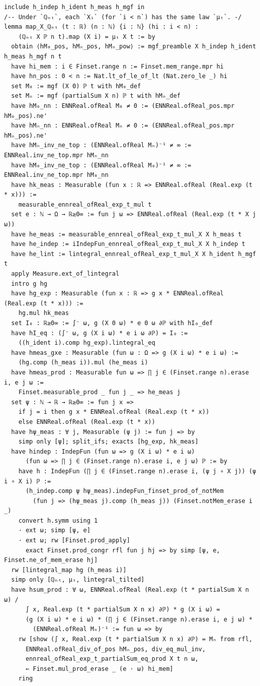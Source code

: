 \newpage
\begin{lstlisting}
include h_indep h_ident h_meas h_mgf in
/-- Under `ℚₙₜ`, each `Xᵢ` (for `i < n`) has the same law `μₜ`. -/
lemma map_X_ℚₙₜ (t : ℝ) (n : ℕ) {i : ℕ} (hi : i < n) :
    (ℚₙₜ X ℙ n t).map (X i) = μₜ X t := by
  obtain ⟨hM₀_pos, hMₙ_pos, hMₙ_pow⟩ := mgf_preamble X h_indep h_ident h_meas h_mgf n t
  have hi_mem : i ∈ Finset.range n := Finset.mem_range.mpr hi
  have hn_pos : 0 < n := Nat.lt_of_le_of_lt (Nat.zero_le _) hi
  set M₀ := mgf (X 0) ℙ t with hM₀_def
  set Mₙ := mgf (partialSum X n) ℙ t with hMₙ_def
  have hM₀_nn : ENNReal.ofReal M₀ ≠ 0 := (ENNReal.ofReal_pos.mpr hM₀_pos).ne'
  have hMₙ_nn : ENNReal.ofReal Mₙ ≠ 0 := (ENNReal.ofReal_pos.mpr hMₙ_pos).ne'
  have hMₙ_inv_ne_top : (ENNReal.ofReal Mₙ)⁻¹ ≠ ∞ := ENNReal.inv_ne_top.mpr hMₙ_nn
  have hM₀_inv_ne_top : (ENNReal.ofReal M₀)⁻¹ ≠ ∞ := ENNReal.inv_ne_top.mpr hM₀_nn
  have hk_meas : Measurable (fun x : ℝ => ENNReal.ofReal (Real.exp (t * x))) :=
    measurable_ennreal_ofReal_exp_t_mul t
  set e : ℕ → Ω → ℝ≥0∞ := fun j ω => ENNReal.ofReal (Real.exp (t * X j ω))
  have he_meas := measurable_ennreal_ofReal_exp_t_mul_X X h_meas t
  have he_indep := iIndepFun_ennreal_ofReal_exp_t_mul_X X h_indep t
  have he_lint := lintegral_ennreal_ofReal_exp_t_mul_X X h_ident h_mgf t
  apply Measure.ext_of_lintegral
  intro g hg
  have hg_exp : Measurable (fun x : ℝ => g x * ENNReal.ofReal (Real.exp (t * x))) :=
    hg.mul hk_meas
  set I₀ : ℝ≥0∞ := ∫⁻ ω, g (X 0 ω) * e 0 ω ∂ℙ with hI₀_def
  have hI_eq : (∫⁻ ω, g (X i ω) * e i ω ∂ℙ) = I₀ :=
    ((h_ident i).comp hg_exp).lintegral_eq
  have hmeas_gxe : Measurable (fun ω : Ω => g (X i ω) * e i ω) :=
    (hg.comp (h_meas i)).mul (he_meas i)
  have hmeas_prod : Measurable fun ω => ∏ j ∈ (Finset.range n).erase i, e j ω :=
    Finset.measurable_prod _ fun j _ => he_meas j
  set ψ : ℕ → ℝ → ℝ≥0∞ := fun j x =>
    if j = i then g x * ENNReal.ofReal (Real.exp (t * x))
    else ENNReal.ofReal (Real.exp (t * x))
  have hψ_meas : ∀ j, Measurable (ψ j) := fun j => by
    simp only [ψ]; split_ifs; exacts [hg_exp, hk_meas]
  have hindep : IndepFun (fun ω => g (X i ω) * e i ω)
      (fun ω => ∏ j ∈ (Finset.range n).erase i, e j ω) ℙ := by
    have h : IndepFun (∏ j ∈ (Finset.range n).erase i, (ψ j ∘ X j)) (ψ i ∘ X i) ℙ :=
      (h_indep.comp ψ hψ_meas).indepFun_finset_prod_of_notMem
        (fun j => (hψ_meas j).comp (h_meas j)) (Finset.notMem_erase i _)
    convert h.symm using 1
    · ext ω; simp [ψ, e]
    · ext ω; rw [Finset.prod_apply]
      exact Finset.prod_congr rfl fun j hj => by simp [ψ, e, Finset.ne_of_mem_erase hj]
  rw [lintegral_map hg (h_meas i)]
  simp only [ℚₙₜ, μₜ, lintegral_tilted]
  have hsum_prod : ∀ ω, ENNReal.ofReal (Real.exp (t * partialSum X n ω) /
      ∫ x, Real.exp (t * partialSum X n x) ∂ℙ) * g (X i ω) =
      (g (X i ω) * e i ω) * (∏ j ∈ (Finset.range n).erase i, e j ω) *
        (ENNReal.ofReal Mₙ)⁻¹ := fun ω => by
    rw [show (∫ x, Real.exp (t * partialSum X n x) ∂ℙ) = Mₙ from rfl,
      ENNReal.ofReal_div_of_pos hMₙ_pos, div_eq_mul_inv,
      ennreal_ofReal_exp_t_partialSum_eq_prod X t n ω,
      ← Finset.mul_prod_erase _ (e · ω) hi_mem]
    ring
\end{lstlisting}
